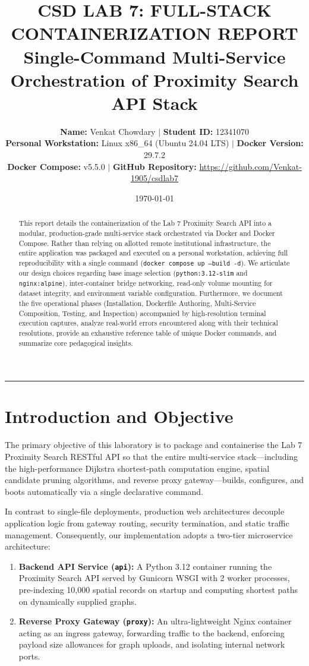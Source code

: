 \documentclass[11pt,a4paper]{article}
\title{\textbf{\Large CSD LAB 7: FULL-STACK CONTAINERIZATION REPORT}\\[0.15cm]
\large Single-Command Multi-Service Orchestration of Proximity Search API Stack}
\author{\textbf{Name:} Venkat Chowdary \quad $\vert$ \quad \textbf{Student ID:} 12341070 \\
\textbf{Personal Workstation:} Linux x86\_64 (Ubuntu 24.04 LTS) \quad $\vert$ \quad \textbf{Docker Version:} 29.7.2 \\
\textbf{Docker Compose:} v5.5.0 \quad $\vert$ \quad \textbf{GitHub Repository:} \url{https://github.com/Venkat-1905/csdlab7}}
\date{\today}
\begin{document}
\maketitle
\vspace{-0.5cm}
\hrule
\vspace{0.3cm}

\begin{abstract}
This report details the containerization of the Lab 7 Proximity Search API into a modular, production-grade multi-service stack orchestrated via Docker and Docker Compose. Rather than relying on allotted remote institutional infrastructure, the entire application was packaged and executed on a personal workstation, achieving full reproducibility with a single command (\texttt{docker compose up --build -d}). We articulate our design choices regarding base image selection (\texttt{python:3.12-slim} and \texttt{nginx:alpine}), inter-container bridge networking, read-only volume mounting for dataset integrity, and environment variable configuration. Furthermore, we document the five operational phases (Installation, Dockerfile Authoring, Multi-Service Composition, Testing, and Inspection) accompanied by high-resolution terminal execution captures, analyze real-world errors encountered along with their technical resolutions, provide an exhaustive reference table of unique Docker commands, and summarize core pedagogical insights.
\end{abstract}

\section{Introduction and Objective}

The primary objective of this laboratory is to package and containerise the Lab 7 Proximity Search RESTful API so that the entire multi-service stack—including the high-performance Dijkstra shortest-path computation engine, spatial candidate pruning algorithms, and reverse proxy gateway—builds, configures, and boots automatically via a single declarative command.

In contrast to single-file deployments, production web architectures decouple application logic from gateway routing, security termination, and static traffic management. Consequently, our implementation adopts a two-tier microservice architecture:
\begin{enumerate}
    \setlength{\itemsep}{0pt}
    \item \textbf{Backend API Service (\texttt{api}):} A Python 3.12 container running the Proximity Search API served by Gunicorn WSGI with 2 worker processes, pre-indexing 10,000 spatial records on startup and computing shortest paths on dynamically supplied graphs.
    \item \textbf{Reverse Proxy Gateway (\texttt{proxy}):} An ultra-lightweight Nginx container acting as an ingress gateway, forwarding traffic to the backend, enforcing payload size allowances for graph uploads, and isolating internal network ports.
\end{enumerate}
\end{document}
